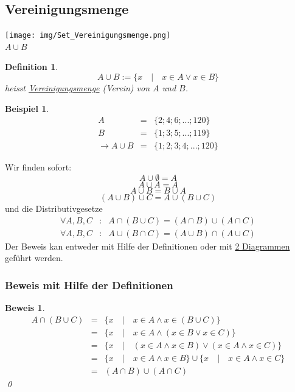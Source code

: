 \documentclass{report}
\newtheorem{mydef}{Definition}
\newtheorem{myexample}{Beispiel}
\newtheorem{myproof}{Beweis}
\begin{document}
\subsection{Vereinigungsmenge}
\begin{center}\texttt{[image: img/Set\_Vereinigungsmenge.png]}\\$A \cup B$\end{center}
\begin{mydef}\begin{equation}A \cup B := \{x \quad | \quad x \in A \lor x \in B\}\end{equation}
heisst \underline{Vereinigungsmenge} (Verein) von $A$ und $B$.\end{mydef}
\begin{myexample}\begin{eqnarray}A & = & \{2; 4; 6; ...; 120\}\nonumber \\
B & = & \{1; 3; 5; ...; 119\} \nonumber \\
\to A \cup B & = & \{1; 2; 3; 4; ...; 120\}\end{eqnarray}\end{myexample}
Wir finden sofort:
\begin{equation}A \cup \emptyset = A\end{equation}
\begin{equation}A \cup A = A\end{equation}
\begin{equation}A \cup B = B \cup A\end{equation}
\begin{equation}(A \cup B) \cup C = A \cup (B \cup C)\end{equation}
und die Distributivgesetze
\begin{eqnarray}\forall A,B,C &:& A \cap (B \cup C) = (A \cap B) \cup (A \cap C)\nonumber \\
\forall A,B,C &:& A \cup (B\cap C) = (A \cup B) \cap (A \cup C)\end{eqnarray}
Der Beweis kan entweder mit Hilfe der Definitionen oder mit \underline{2 Diagrammen} geführt werden.
\subsubsection{Beweis mit Hilfe der Definitionen}
\begin{myproof}\begin{eqnarray}A \cap (B \cup C) & = & \{x \quad | \quad x \in A \land x \in (B \cup C)\} \nonumber \\
& = & \{x \quad | \quad x \in A \land (x \in B \lor x \in C)\} \nonumber \\
& = & \{x \quad | \quad (x \in A \land x \in B) \lor (x \in A \land x \in C)\} \nonumber \\
& = & \{x \quad | \quad x \in A \land x \in B \} \cup \{x \quad | \quad x \in A \land x \in C\} \nonumber \\
& = & (A \cap B) \cup (A \cap C)\end{eqnarray}\qed
\end{myproof}
\end{document}
